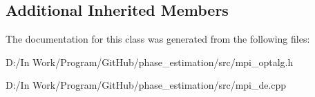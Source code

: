 \subsection*{Additional Inherited Members}


The documentation for this class was generated from the following files\+:\begin{DoxyCompactItemize}
\item 
D\+:/\+In Work/\+Program/\+Git\+Hub/phase\+\_\+estimation/src/mpi\+\_\+optalg.\+h\item 
D\+:/\+In Work/\+Program/\+Git\+Hub/phase\+\_\+estimation/src/mpi\+\_\+de.\+cpp\end{DoxyCompactItemize}
